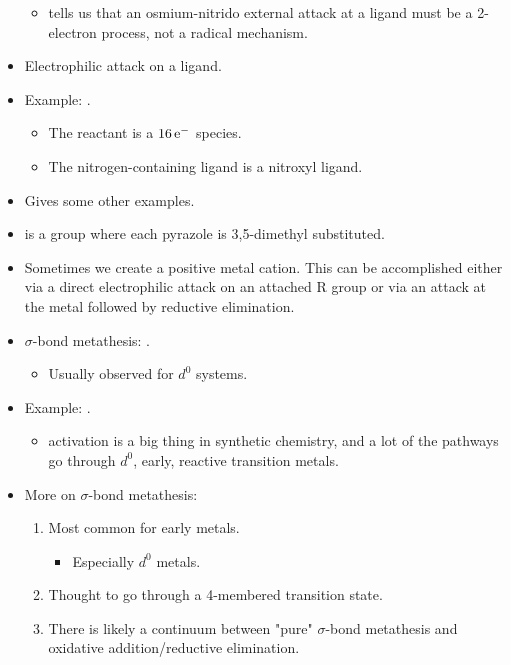 \documentclass[../notes.tex]{subfiles}
\begin{document}
\begin{itemize}
    \begin{itemize}
        \item \textcite{bib:CrevierMayer} tells us that an osmium-nitrido external attack at a ligand must be a 2-electron process, not a radical mechanism.
    \end{itemize}
    \item Electrophilic attack on a ligand.
    \item Example: .
    \begin{itemize}
        \item The reactant is a $16\,\e[-]$ species.
        \item The nitrogen-containing ligand is a nitroxyl ligand.
    \end{itemize}
    \item Gives some other examples.
    \item {} is a  group where each pyrazole is 3,5-dimethyl substituted.
    \item Sometimes we create a positive metal cation. This can be accomplished either via a direct electrophilic attack on an attached R group or via an attack at the metal followed by reductive elimination.
    \item $\sigma$-bond metathesis: .
    \begin{itemize}
        \item Usually observed for $d^0$ systems.
    \end{itemize}
    \item Example: .
    \begin{itemize}
        \item {} activation is a big thing in synthetic chemistry, and a lot of the pathways go through $d^0$, early, reactive transition metals.
    \end{itemize}
    \item More on $\sigma$-bond metathesis:
    \begin{enumerate}
        \item Most common for early metals.
        \begin{itemize}
            \item Especially $d^0$ metals.
        \end{itemize}
        \item Thought to go through a 4-membered transition state.
        \item There is likely a continuum between "pure" $\sigma$-bond metathesis and oxidative addition/reductive elimination.

\end{enumerate}
\end{itemize}
\end{document}
